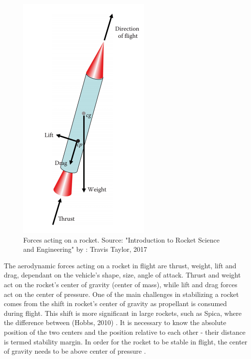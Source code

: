 \begin{figure}[h!]
  \centering
  \includegraphics[scale=0.8]{graphics/forces.png}
  \caption{Forces acting on a rocket. Source: "Introduction to Rocket Science and Engineering" by : Travis Taylor, 2017}
  \label{forces}
\end{figure}

The aerodynamic forces acting on a rocket in flight are thrust, weight, lift and drag, dependant on the vehicle's shape, size, angle of attack.
Thrust and weight act on the rocket’s center of gravity (center of mass), while lift and drag forces act on the center of pressure. 
One of the main challenges in stabilizing a rocket comes from the shift in rocket's center of gravity as propellant is consumed during flight. This shift is more significant in large rockets, such as Spica, where the difference between  (Hobbs, 2010) \cite{hobbs2010basics}. It is necessary to know the absolute position of the two centers and the position relative to each other - their distance is termed stability margin. In order for the rocket to be stable in flight, the center of gravity needs to be above center of pressure \cite{taylor2017introduction}. 

